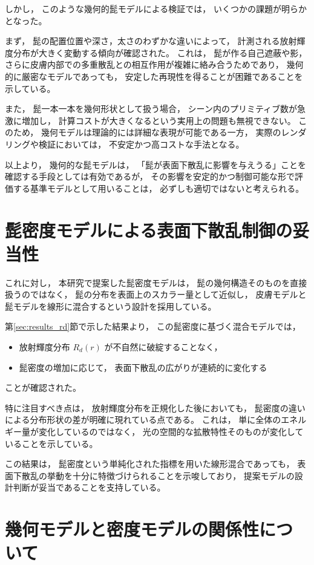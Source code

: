 しかし，
このような幾何的髭モデルによる検証では，
いくつかの課題が明らかとなった。

まず，
髭の配置位置や深さ，太さのわずかな違いによって，
計測される放射輝度分布が大きく変動する傾向が確認された。
これは，
髭が作る自己遮蔽や影，
さらに皮膚内部での多重散乱との相互作用が複雑に絡み合うためであり，
幾何的に厳密なモデルであっても，
安定した再現性を得ることが困難であることを示している。

また，
髭一本一本を幾何形状として扱う場合，
シーン内のプリミティブ数が急激に増加し，
計算コストが大きくなるという実用上の問題も無視できない。
このため，
幾何モデルは理論的には詳細な表現が可能である一方，
実際のレンダリングや検証においては，
不安定かつ高コストな手法となる。

以上より，
幾何的な髭モデルは，
「髭が表面下散乱に影響を与えうる」ことを確認する手段としては有効であるが，
その影響を安定的かつ制御可能な形で評価する基準モデルとして用いることは，
必ずしも適切ではないと考えられる。

\section{髭密度モデルによる表面下散乱制御の妥当性}

これに対し，
本研究で提案した髭密度モデルは，
髭の幾何構造そのものを直接扱うのではなく，
髭の分布を表面上のスカラー量として近似し，
皮膚モデルと髭モデルを線形に混合するという設計を採用している。

第\ref{sec:results_rd}節で示した結果より，
この髭密度に基づく混合モデルでは，

\begin{itemize}
  \item 放射輝度分布 $R_d(r)$ が不自然に破綻することなく，
  \item 髭密度の増加に応じて，
        表面下散乱の広がりが連続的に変化する
\end{itemize}

ことが確認された。

特に注目すべき点は，
放射輝度分布を正規化した後においても，
髭密度の違いによる分布形状の差が明確に現れている点である。
これは，
単に全体のエネルギー量が変化しているのではなく，
光の空間的な拡散特性そのものが変化していることを示している。

この結果は，
髭密度という単純化された指標を用いた線形混合であっても，
表面下散乱の挙動を十分に特徴づけられることを示唆しており，
提案モデルの設計判断が妥当であることを支持している。

\section{幾何モデルと密度モデルの関係性について}

